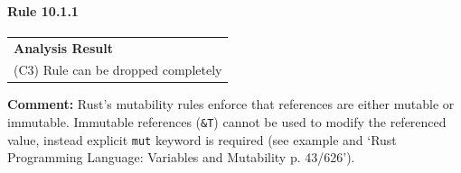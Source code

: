 \paragraph{Rule 10.1.1}
\begin{longtable}{p{13cm}}
\textbf{Analysis Result} \\
(C3) Rule can be dropped completely \\
\end{longtable}
\textbf{Comment:} Rust's mutability rules enforce that references are either mutable or immutable. Immutable references (\texttt{\&T}) cannot be used to modify the referenced value, instead explicit \texttt{mut} keyword is required (see example and `Rust Programming Language: Variables and Mutability p. 43/626'). \\


